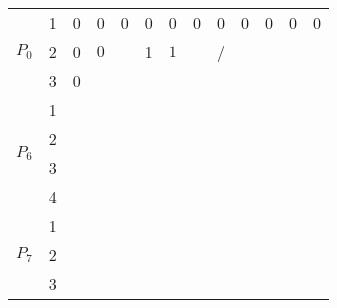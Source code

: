 \documentclass[11pt]{article}
\begin{document}
\begin{small}
{\begin{tabular}{ccc|c|c|c|c|c|c|c|c|c|c|}
 
\multicolumn{1}{|c|}{\multirow{3}{*}{$P_0$}} & \multicolumn{1}{c|}{1}
 & 0 & 0 & 0 & 0 & 0 & 0 & 0 & 0 & 0 & 0 & 0 \\ \cline{2-13} 
\multicolumn{1}{|c|}{}                       & \multicolumn{1}{c|}{2}
 & 0 & $0$ &  & 1 & $1$ &  & / &  &  &  &  \\ \cline{2-13} 
\multicolumn{1}{|c|}{}                       & \multicolumn{1}{c|}{3}
  & 0 &  &  &  &  &  &  &  &  &  &  \\ \hline
 
\multicolumn{1}{|c|}{\multirow{4}{*}{$P_6$}} & \multicolumn{1}{c|}{1}
  &  &  &  &  &  &  &  &  &  &  &  \\ \cline{2-13} 
\multicolumn{1}{|c|}{}                       & \multicolumn{1}{c|}{2}
  &  &  &  &  &  &  &  &  &  &  &  \\ \cline{2-13} 
\multicolumn{1}{|c|}{}                       & \multicolumn{1}{c|}{3}
  &  &  &  &  &  &  &  &  &  &  &  \\ \cline{2-13} 
\multicolumn{1}{|c|}{}                       & \multicolumn{1}{c|}{4}
  &  &  &  &  &  &  &  &  &  &  &  \\ \hline
 
\multicolumn{1}{|c|}{\multirow{3}{*}{$P_7$}} & \multicolumn{1}{c|}{1}
  &  &  &  &  &  &  &  &  &  &  &  \\ \cline{2-13} 
\multicolumn{1}{|c|}{}                       & \multicolumn{1}{c|}{2}
  &  &  &  &  &  &  &  &  &  &  &  \\ \cline{2-13} 
\multicolumn{1}{|c|}{}                       & \multicolumn{1}{c|}{3}
  &  &  &  &  &  &  &  &  &  &  &  \\ \hline
\end{tabular}

}

\end{small}
\end{document}
